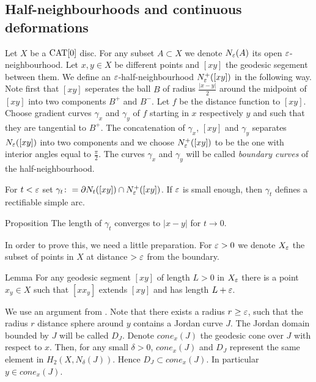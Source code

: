 \documentclass[a4paper,10pt]{amsart}
\begin{document}
\subsection{Half-neighbourhoods and continuous deformations}

Let $X$ be a $\mathop{\rm CAT}\nolimits[0]$ disc. For any subset $A\subset X$ we denote $N_\varepsilon (A)$ its open $\varepsilon$-neighbourhood.
Let $x,y\in X$ be different points and $[xy]$ the geodesic segement between them. We define an $\varepsilon$-half-neighbourhood
$N^+_\varepsilon ([xy])$ in the following way. Note first that $[xy]$ seperates the ball $B$ of radius $\frac{|x-y|}{2}$ around
the midpoint of $[xy]$ into two components $B^+$ and $B^-$. Let $f$ be the distance function to $[xy]$. Choose gradient curves 
$\gamma_x$ and $\gamma_y$ of $f$ starting in $x$ respectively $y$ and such that they are tangential to $B^+$. The concatenation
of $\gamma_x$, $[xy]$ and $\gamma_y$ separates $N_\varepsilon([xy])$ into two components and we choose $N^+_\varepsilon ([xy])$ to be the one
with interior angles equal to  $\frac{\pi}{2}$. The curves $\gamma_x$ and $\gamma_y$ will be called {\em boundary curves} of the 
half-neighbourhood.


For $t<\varepsilon$ set $\gamma_t\colon=\partial N_t([xy])\cap N^+_\varepsilon ([xy])$. If $\varepsilon$
is small enough, then $\gamma_t$ defines a rectifiable simple arc.


\begin{thm}{Proposition}\label{prop:length continuity}
The length of $\gamma_t$ converges to $|x-y|$ for $t\to 0$.
\end{thm}

In order to prove this, we need a little preparation. For $\varepsilon>0$ we denote
$X_\varepsilon$ the subset of points in $X$ at distance $>\varepsilon$ from the boundary.

\begin{thm}{Lemma}\label{lem:extension}
For any geodesic segment $[xy]$ of length $L>0$ in $X_\varepsilon$ there is a point 
$x_y\in X$ such that $[x x_y]$ extends $[xy]$ and has length $L+\varepsilon$.
\end{thm}
We use an argument from \cite{Kleiner}. Note that there exists a radius $r\geq\varepsilon$, such 
that the radius $r$ distance sphere around $y$ contains a Jordan curve $J$. The Jordan domain bounded by $J$
will be called $D_J$.
Denote $cone_x(J)$ the geodesic cone over $J$ with respect to $x$. Then, 
for any small $\delta>0$, $cone_x(J)$ and $D_J$
represent the same element in $H_2(X,N_\delta(J))$. Hence $D_J\subset cone_x(J)$. 
In particular $y\in cone_x(J)$.
\qeds
\end{document}
